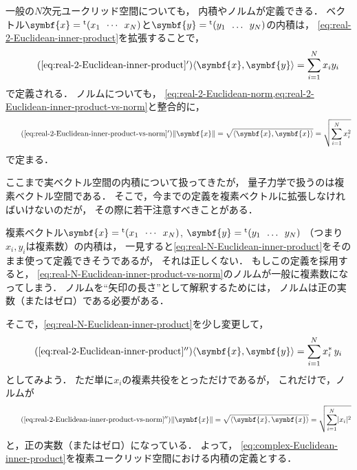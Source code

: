 \documentclass[
]{sotsu}
\begin{document}
\quad 
一般の$N$次元ユークリッド空間についても，
内積やノルムが定義できる．
ベクトル$\symbf{x} = \cvector{x_1 ; \cdots ; x_N}$と$\symbf{y} = \cvector{y_1 ; \dots ; y_N}$の内積は，
\cref{eq:real-2-Euclidean-inner-product}を拡張することで，
\begin{equation}
    \label{eq:real-N-Euclidean-inner-product}
    \tag{\ref*{eq:real-2-Euclidean-inner-product}$'$}
    \iparen{\symbf{x}, \symbf{y}}
    = \sum_{i = 1}^{N} x_i y_i
\end{equation}
で定義される．
ノルムについても，
\cref{eq:real-2-Euclidean-norm,eq:real-2-Euclidean-inner-product-vs-norm}と整合的に，
\begin{equation}
    \label{eq:real-N-Euclidean-inner-product-vs-norm}
    \tag{\ref*{eq:real-2-Euclidean-inner-product-vs-norm}$'$}
    \norm{\symbf{x}} 
    = \sqrt{\iparen{\symbf{x}, \symbf{x}}}
    = \sqrt{ \sum_{i = 1}^{N} x_i^2 }
\end{equation}
で定まる．


\quad 
ここまで実ベクトル空間の内積について扱ってきたが，
量子力学で扱うのは複素ベクトル空間である．
そこで，今までの定義を複素ベクトルに拡張しなければいけないのだが，
その際に若干注意すべきことがある．

複素ベクトル$\symbf{x} = \cvector{x_1 ; \cdots ; x_N}$, 
$\symbf{y} = \cvector{y_1 ; \dots ; y_N}$
（つまり$x_i, y_i$は複素数）の内積は，
一見すると\cref{eq:real-N-Euclidean-inner-product}をそのまま使って定義できそうであるが，
それは正しくない．
もしこの定義を採用すると，
\cref{eq:real-N-Euclidean-inner-product-vs-norm}のノルムが一般に複素数になってしまう．
ノルムを``矢印の長さ''として解釈するためには，
ノルムは正の実数（またはゼロ）である必要がある．

そこで，\cref{eq:real-N-Euclidean-inner-product}を少し変更して，
\begin{equation}
    \label{eq:complex-Euclidean-inner-product}
    \tag{\ref*{eq:real-2-Euclidean-inner-product}$''$}
    \iparen{\symbf{x}, \symbf{y}}
    = \sum_{i = 1}^{N} \conj{x_i} \, y_i
\end{equation}
としてみよう．
ただ単に$x_i$の複素共役をとっただけであるが，
これだけで，ノルムが
\begin{equation}
    \label{eq:complex-Euclidean-inner-product-vs-norm}
    \tag{\ref*{eq:real-2-Euclidean-inner-product-vs-norm}$''$}
    \norm{\symbf{x}} 
    = \sqrt{ \iparen{\symbf{x}, \symbf{x}} }
    = \sqrt{ \sum_{i = 1}^{N} \abs{x_i}^2 }
\end{equation}
と，正の実数（またはゼロ）になっている．
よって，
\cref{eq:complex-Euclidean-inner-product}を複素ユークリッド空間における内積の定義とする．
\end{document}
